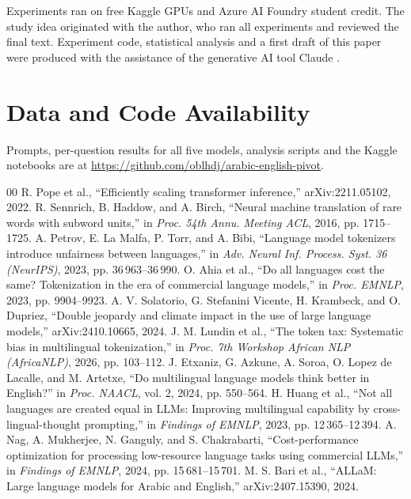 \documentclass[conference,a4paper]{IEEEtran}
\begin{document}
Experiments ran on free Kaggle GPUs and Azure AI Foundry student credit. The
study idea originated with the author, who ran all experiments and reviewed the
final text. Experiment code, statistical analysis and a first draft of this
paper were produced with the assistance of the generative AI tool Claude
\cite{claude}.

\section*{Data and Code Availability}

Prompts, per-question results for all five models, analysis scripts and the
Kaggle notebooks are at
\url{https://github.com/oblhdj/arabic-english-pivot}.

\begin{thebibliography}{00}
 R. Pope et al., ``Efficiently scaling transformer inference,'' arXiv:2211.05102, 2022.
 R. Sennrich, B. Haddow, and A. Birch, ``Neural machine translation of rare words with subword units,'' in \emph{Proc. 54th Annu. Meeting ACL}, 2016, pp. 1715--1725.
 A. Petrov, E. La Malfa, P. Torr, and A. Bibi, ``Language model tokenizers introduce unfairness between languages,'' in \emph{Adv. Neural Inf. Process. Syst. 36 (NeurIPS)}, 2023, pp. 36\,963--36\,990.
 O. Ahia et al., ``Do all languages cost the same? Tokenization in the era of commercial language models,'' in \emph{Proc. EMNLP}, 2023, pp. 9904--9923.
 A. V. Solatorio, G. Stefanini Vicente, H. Krambeck, and O. Dupriez, ``Double jeopardy and climate impact in the use of large language models,'' arXiv:2410.10665, 2024.
 J. M. Lundin et al., ``The token tax: Systematic bias in multilingual tokenization,'' in \emph{Proc. 7th Workshop African NLP (AfricaNLP)}, 2026, pp. 103--112.
 J. Etxaniz, G. Azkune, A. Soroa, O. Lopez de Lacalle, and M. Artetxe, ``Do multilingual language models think better in English?'' in \emph{Proc. NAACL}, vol. 2, 2024, pp. 550--564.
 H. Huang et al., ``Not all languages are created equal in LLMs: Improving multilingual capability by cross-lingual-thought prompting,'' in \emph{Findings of EMNLP}, 2023, pp. 12\,365--12\,394.
 A. Nag, A. Mukherjee, N. Ganguly, and S. Chakrabarti, ``Cost-performance optimization for processing low-resource language tasks using commercial LLMs,'' in \emph{Findings of EMNLP}, 2024, pp. 15\,681--15\,701.
 M. S. Bari et al., ``ALLaM: Large language models for Arabic and English,'' arXiv:2407.15390, 2024.

\end{thebibliography}
\end{document}
